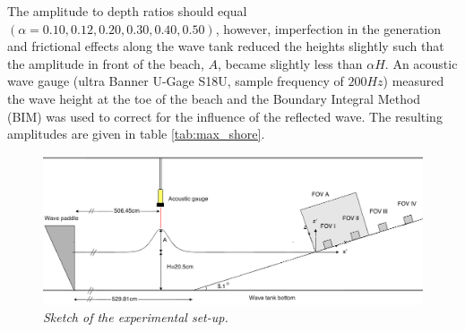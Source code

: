\documentclass[review, authoryear]{elsarticle}
\begin{document}
The amplitude to depth ratios should equal $(\alpha=0.10,0.12,0.20,0.30,0.40,0.50)$,  
however, imperfection in the generation and frictional effects along
the wave tank reduced the heights slightly such that the amplitude in front of the
beach, $A$, became slightly less than $\alpha H$.  
An acoustic wave gauge (ultra Banner U-Gage S18U, sample frequency of $200Hz$) measured the wave height at the toe of the beach and the Boundary Integral Method (BIM) was used to correct for  the influence of the reflected wave.
The resulting amplitudes are given in table \ref{tab:max_shore}.


\begin{figure}[]
\centering
\includegraphics[width=\textwidth]{./Figures/setup3.png}
\caption{\textit{ Sketch of  the experimental set-up.}}
\label{fig:beach_tegning}
\end{figure}
\end{document}
